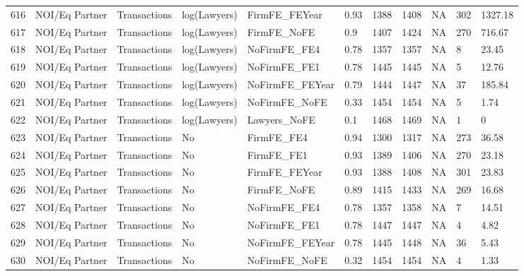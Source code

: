 \begin{table}[ht]
\begin{tabular}{rllllllllll}
  616 & NOI/Eq Partner & Transactions & log(Lawyers) & FirmFE\_FEYear & 0.93 & 1388 & 1408 & NA & 302 & 1327.18 \\ 
  617 & NOI/Eq Partner & Transactions & log(Lawyers) & FirmFE\_NoFE & 0.9 & 1407 & 1424 & NA & 270 & 716.67 \\ 
  618 & NOI/Eq Partner & Transactions & log(Lawyers) & NoFirmFE\_FE4 & 0.78 & 1357 & 1357 & NA & 8 & 23.45 \\ 
  619 & NOI/Eq Partner & Transactions & log(Lawyers) & NoFirmFE\_FE1 & 0.78 & 1445 & 1445 & NA & 5 & 12.76 \\ 
  620 & NOI/Eq Partner & Transactions & log(Lawyers) & NoFirmFE\_FEYear & 0.79 & 1444 & 1447 & NA & 37 & 185.84 \\ 
  621 & NOI/Eq Partner & Transactions & log(Lawyers) & NoFirmFE\_NoFE & 0.33 & 1454 & 1454 & NA & 5 & 1.74 \\ 
  622 & NOI/Eq Partner & Transactions & log(Lawyers) & Lawyers\_NoFE & 0.1 & 1468 & 1469 & NA & 1 & 0 \\ 
  623 & NOI/Eq Partner & Transactions & No & FirmFE\_FE4 & 0.94 & 1300 & 1317 & NA & 273 & 36.58 \\ 
  624 & NOI/Eq Partner & Transactions & No & FirmFE\_FE1 & 0.93 & 1389 & 1406 & NA & 270 & 23.18 \\ 
  625 & NOI/Eq Partner & Transactions & No & FirmFE\_FEYear & 0.93 & 1388 & 1408 & NA & 301 & 23.83 \\ 
  626 & NOI/Eq Partner & Transactions & No & FirmFE\_NoFE & 0.89 & 1415 & 1433 & NA & 269 & 16.68 \\ 
  627 & NOI/Eq Partner & Transactions & No & NoFirmFE\_FE4 & 0.78 & 1357 & 1358 & NA & 7 & 14.51 \\ 
  628 & NOI/Eq Partner & Transactions & No & NoFirmFE\_FE1 & 0.78 & 1447 & 1447 & NA & 4 & 4.82 \\ 
  629 & NOI/Eq Partner & Transactions & No & NoFirmFE\_FEYear & 0.78 & 1445 & 1448 & NA & 36 & 5.43 \\ 
  630 & NOI/Eq Partner & Transactions & No & NoFirmFE\_NoFE & 0.32 & 1454 & 1454 & NA & 4 & 1.33 \\ 
   \hline
\end{tabular}
\end{table}
